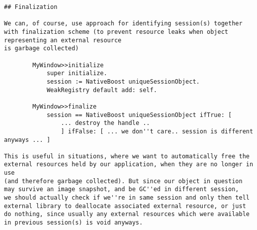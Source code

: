 \documentclass[a4paper,10pt,twoside]{book}
\begin{document}
\begin{verbatim}
## Finalization

We can, of course, use approach for identifying session(s) together
with finalization scheme (to prevent resource leaks when object
representing an external resource
is garbage collected)

		MyWindow>>initialize
			super initialize.
			session := NativeBoost uniqueSessionObject.
			WeakRegistry default add: self.
			
		MyWindow>>finalize
			session == NativeBoost uniqueSessionObject ifTrue: [
				... destroy the handle ..
				] ifFalse: [ ... we don''t care.. session is different anyways ... ]

This is useful in situations, where we want to automatically free the
external resources held by our application, when they are no longer in
use
(and therefore garbage collected). But since our object in question
may survive an image snapshot, and be GC''ed in different session,
we should actually check if we''re in same session and only then tell
external library to deallocate associated external resource, or just
do nothing, since usually any external resources which were available
in previous session(s) is void anyways.

\end{verbatim}

% 
% 
% 
\end{document}
